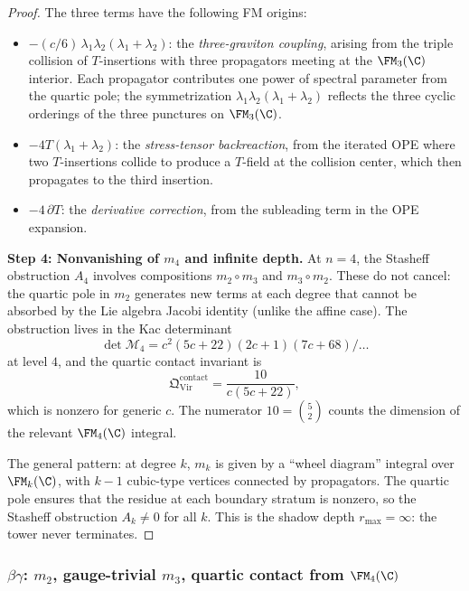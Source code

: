 \begin{proof}
The three terms have the following FM origins:
\begin{itemize}
\item $-(c/6)\,\lambda_1\lambda_2(\lambda_1 + \lambda_2)$:
 the \emph{three-graviton coupling}, arising from the
 triple collision of $T$-insertions with three propagators
 meeting at the $\FM_3(\C)$ interior. Each propagator
 contributes one power of spectral parameter from the
 quartic pole; the symmetrization
 $\lambda_1\lambda_2(\lambda_1 + \lambda_2)$ reflects
 the three cyclic orderings of the three punctures on
 $\FM_3(\C)$.
\item $-4T(\lambda_1 + \lambda_2)$: the
 \emph{stress-tensor backreaction}, from the iterated
 OPE where two $T$-insertions collide to produce a
 $T$-field at the collision center, which then propagates
 to the third insertion.
\item $-4\,\partial T$: the \emph{derivative correction},
 from the subleading term in the OPE expansion.
\end{itemize}

\medskip
\textbf{Step 4: Nonvanishing of $m_4$ and infinite depth.}
At $n = 4$, the Stasheff obstruction $A_4$ involves
compositions $m_2 \circ m_3$ and $m_3 \circ m_2$.
These do not cancel: the quartic pole in $m_2$ generates
new terms at each degree that cannot be absorbed by the
Lie algebra Jacobi identity (unlike the affine case).
The obstruction lives in the Kac determinant
\[
\det \mathcal{M}_4
= c^2(5c + 22)(2c + 1)(7c + 68)/\ldots
\]
at level $4$, and the quartic contact invariant is
\[
\mathfrak{Q}^{\mathrm{contact}}_{\mathrm{Vir}}
= \frac{10}{c(5c+22)},
\]
which is nonzero for generic $c$. The numerator
$10 = \binom{5}{2}$ counts the dimension of the relevant
$\FM_4(\C)$ integral.

The general pattern: at degree $k$, $m_k$ is given by
a ``wheel diagram'' integral over $\FM_k(\C)$, with
$k-1$ cubic-type vertices connected by propagators.
The quartic pole ensures that the residue at each
boundary stratum is nonzero, so the Stasheff obstruction
$A_k \ne 0$ for all $k$. This is the shadow depth
$r_{\max} = \infty$: the tower never terminates.
\end{proof}


\subsubsection{$\beta\gamma$: $m_2$, gauge-trivial $m_3$,
quartic contact from $\FM_4(\C)$}

